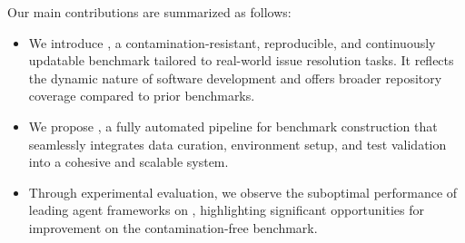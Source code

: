 

Our main contributions are summarized as follows:
\begin{itemize}[leftmargin=*]
\item We introduce \benchmark, a contamination-resistant, reproducible, and continuously updatable benchmark tailored to real-world issue resolution tasks. It reflects the dynamic nature of software development and offers broader repository coverage compared to prior benchmarks.
\item We propose \method, a fully automated pipeline for benchmark construction that seamlessly integrates data curation, environment setup, and test validation into a cohesive and scalable system.
\item Through experimental evaluation, we observe the suboptimal performance of leading agent frameworks on \benchmark, highlighting significant opportunities for improvement on the contamination-free benchmark.
\end{itemize}
